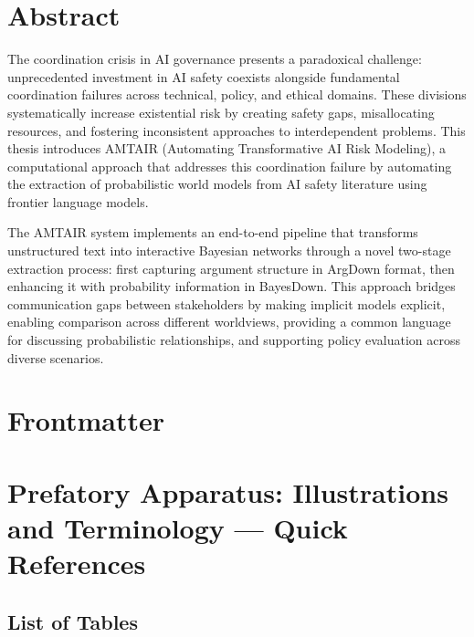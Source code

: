 \documentclass[12pt,a4paper]{book}      %
\begin{document}


\chapter{Abstract}\label{abstract}

The coordination crisis in AI governance presents a paradoxical
challenge: unprecedented investment in AI safety coexists alongside
fundamental coordination failures across technical, policy, and ethical
domains. These divisions systematically increase existential risk by
creating safety gaps, misallocating resources, and fostering
inconsistent approaches to interdependent problems. This thesis
introduces AMTAIR (Automating Transformative AI Risk Modeling), a
computational approach that addresses this coordination failure by
automating the extraction of probabilistic world models from AI safety
literature using frontier language models.

The AMTAIR system implements an end-to-end pipeline that transforms
unstructured text into interactive Bayesian networks through a novel
two-stage extraction process: first capturing argument structure in
ArgDown format, then enhancing it with probability information in
BayesDown. This approach bridges communication gaps between stakeholders
by making implicit models explicit, enabling comparison across different
worldviews, providing a common language for discussing probabilistic
relationships, and supporting policy evaluation across diverse
scenarios.

\chapter{}\label{section}

\chapter{Frontmatter}\label{frontmatter}

\chapter{Prefatory Apparatus: Illustrations and Terminology --- Quick
References}\label{prefatory-apparatus-illustrations-and-terminology-quick-references}

\section{List of Tables}\label{list-of-tables}
\end{document}
